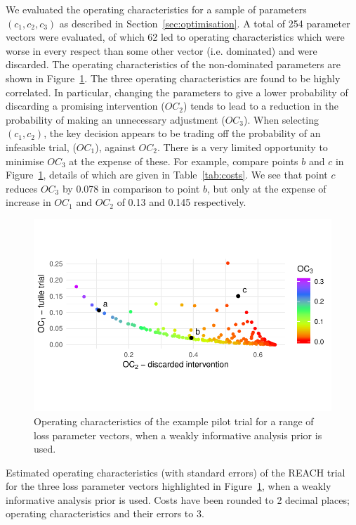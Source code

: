 \documentclass[AMA,STIX1COL]{WileyNJD-v2}
\begin{document}
We evaluated the operating characteristics for a sample of parameters $(c_1, c_2, c_3)$ as described in Section~\ref{sec:optimisation}. A total of 254 parameter vectors were evaluated, of which 62 led to operating characteristics which were worse in every respect than some other vector (i.e. dominated) and were discarded. The operating characteristics of the non-dominated parameters are shown in Figure~\ref{fig:p_front}. The three operating characteristics are found to be highly correlated. In particular, changing the parameters to give a lower probability of discarding a promising intervention ($OC_2$) tends to lead to a reduction in the probability of making an unnecessary adjustment ($OC_3$). When selecting $(c_1, c_2)$, the key decision appears to be trading off the probability of an infeasible trial, ($OC_{1}$), against $OC_{2}$. There is a very limited opportunity to minimise $OC_{3}$ at the expense of these. For example, compare points $b$ and $c$ in Figure~\ref{fig:p_front}, details of which are given in Table~\ref{tab:costs}. We see that point $c$ reduces $OC_3$ by 0.078 in comparison to point $b$, but only at the expense of increase in $OC_1$ and $OC_2$ of 0.13 and 0.145 respectively.

\begin{figure}
\centering
\includegraphics[scale=0.8]{./figures/p_front}
\caption{Operating characteristics of the example pilot trial for a range of loss parameter vectors, when a weakly informative analysis prior is used.}
\label{fig:p_front}
\end{figure}

\begin{table}
\centering
\caption{Estimated operating characteristics (with standard errors) of the REACH trial for the three loss parameter vectors highlighted in Figure~\ref{fig:p_front}, when a weakly informative analysis prior is used. Costs have been rounded to 2 decimal places; operating characteristics and their errors to 3.}

\label{tab:costs}
\end{table}
\end{document}
